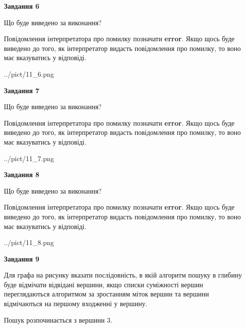 \documentclass[12pt, ukrainian]{article}
\begin{document}
{\begin {large}
{\begin {center}\textbf{Завдання 6}\end {center}}\par
Що буде виведено за виконання?

Повідомлення інтерпретатора про помилку позначати \textbf{error}.
Якщо щось буде виведено до того, як інтерпретатор видасть повідомлення про помилку, 
то воно має вказуватись у відповіді. \par


\begin{center}
	{../pict/11_6.png}
\end{center}
\newpage

{\begin {center}\textbf{Завдання 7}\end {center}}\par
Що буде виведено за виконання?

Повідомлення інтерпретатора про помилку позначати \textbf{error}.
Якщо щось буде виведено до того, як інтерпретатор видасть повідомлення про помилку, 
то воно має вказуватись у відповіді. \par


\begin{center}
	{../pict/11_7.png}
\end{center}
\newpage

{\begin {center}\textbf{Завдання 8}\end {center}}\par
Що буде виведено за виконання?

Повідомлення інтерпретатора про помилку позначати \textbf{error}.
Якщо щось буде виведено до того, як інтерпретатор видасть повідомлення про помилку, 
то воно має вказуватись у відповіді. \par


\begin{center}
	{../pict/11_8.png}
\end{center}
\newpage

{\begin {center}\textbf{Завдання 9}\end {center}}\par
Для графа на рисунку вказати послідовність, в якій алгоритм пошуку в глибину буде відмічати відвідані вершини, якщо списки суміжності вершин переглядаються алгоритмом за зростанням міток вершин та вершини відмічаються на першому вход\-женні у вершину.\par
Пошук розпочинається з вершини 3.\par


\end{large}}
\end{document}

